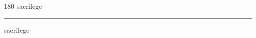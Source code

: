 
\begin{frame}
\begin{center}
\begin{turn}{180}
{\fontsize{2.5cm}{1em}\selectfont sacrilege}
\end{turn}
\vspace{1em}\par  
\hrule
\vspace{1em}\par  
{\fontsize{2.5cm}{1em}\selectfont sacrilege}
\end{center}
\end{frame}
